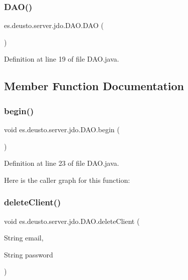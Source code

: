 \subsubsection{\texorpdfstring{DAO()}{DAO()}}
{\footnotesize\ttfamily es.\+deusto.\+server.\+jdo.\+D\+A\+O.\+D\+AO (\begin{DoxyParamCaption}{ }\end{DoxyParamCaption})}



Definition at line 19 of file D\+A\+O.\+java.



\subsection{Member Function Documentation}
\mbox{\label{classes_1_1deusto_1_1server_1_1jdo_1_1_d_a_o_ad923bb21c8273dabc601b85713703c89}} 
\subsubsection{\texorpdfstring{begin()}{begin()}}
{\footnotesize\ttfamily void es.\+deusto.\+server.\+jdo.\+D\+A\+O.\+begin (\begin{DoxyParamCaption}{ }\end{DoxyParamCaption})}



Definition at line 23 of file D\+A\+O.\+java.

Here is the caller graph for this function\+:
\mbox{\label{classes_1_1deusto_1_1server_1_1jdo_1_1_d_a_o_a9664ce68819a53c7b27add7f305a52b0}} 
\subsubsection{\texorpdfstring{deleteClient()}{deleteClient()}\hspace{0.1cm}{\footnotesize\ttfamily [1/2]}}
{\footnotesize\ttfamily void es.\+deusto.\+server.\+jdo.\+D\+A\+O.\+delete\+Client (\begin{DoxyParamCaption}\item[{String}]{email,  }\item[{String}]{password }\end{DoxyParamCaption})}



